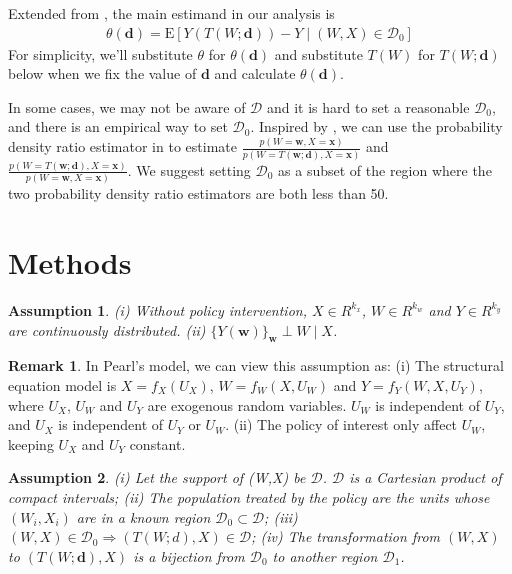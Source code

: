 \documentclass[11pt]{article}
\def\E{{\mathrm E}}
\numberwithin{equation}{section}
\newtheorem{assumption}{Assumption}[section]
\theoremstyle{definition}
\newtheorem{remark}{Remark}[section]
\begin{document}
Extended from \cite{munoz2012population}, the main estimand in our analysis is
\begin{align}
    \theta(\mathbf{d})=\E[Y(T(W;\mathbf{d}))-Y\mid (W,X)\in \mathcal{D}_0] 
\end{align}
For simplicity, we'll substitute $\theta$ for $\theta(\mathbf{d})$ and substitute $T(W)$ for $T(W;\mathbf{d})$ below when we fix the value of $\mathbf{d}$ and calculate $\theta(\mathbf{d})$.

In some cases, we may not be aware of $\mathcal{D}$ and it is hard to set a reasonable $\mathcal{D}_0$, and there is an empirical way to set $\mathcal{D}_0$. Inspired by \cite{mccoy2023semi}, we can use the probability density ratio estimator in \cite{lin2023estimation} to estimate $\frac{p(W=\mathbf{w},X=\mathbf{x})}{p(W=T(\mathbf{w};\mathbf{d}),X=\mathbf{x})}$ and $\frac{p(W=T(\mathbf{w};\mathbf{d}),X=\mathbf{x})}{p(W=\mathbf{w},X=\mathbf{x})}$. We suggest setting $\mathcal{D}_0$ as a subset of the region where the two probability density ratio estimators are both less than 50.

\section{Methods}\label{sec:setup}
\begin{assumption}\label{ass:1}
(i) Without policy intervention, $X \in R^{k_x}$, $W \in R^{k_w}$ and $Y \in R^{k_y}$ are continuously distributed. (ii) $\{Y(\mathbf{w})\}_{\mathbf{w}}\perp W\mid X$.
\end{assumption}
\begin{remark}
In Pearl's model, we can view this assumption as: (i) The structural equation model is $X = f_X(U_X)$, $W = f_W(X, U_W)$ and $Y = f_Y (W, X, U_Y )$, where  $U_{X}$, $U_{W}$ and  $U_{Y}$  are exogenous random variables. $U_{W}$ is independent of $ U_{Y}$, and $U_{X}$ is independent of $ U_{Y}$ or $U_{W}$. (ii) The policy of interest only affect $U_{W}$, keeping $U_{X}$ and $ U_{Y}$ constant.
\end{remark}


\begin{assumption}\label{ass:2}
(i) Let the support of (W,X) be $\mathcal{D}$. $\mathcal{D}$ is a Cartesian product of compact intervals; (ii) The population treated by the policy are the units whose $(W_i,X_i)$ are in a known region $\mathcal{D}_0\subset\mathcal{D}$; (iii) $(W,X) \in \mathcal{D}_0\Rightarrow (T(W;d),X)\in \mathcal{D}$; (iv) The transformation from $(W,X)$ to $(T(W;\mathbf{d}),X)$ is a bijection from $\mathcal{D}_0$ to another region $\mathcal{D}_1$.
\end{assumption}
\end{document}
